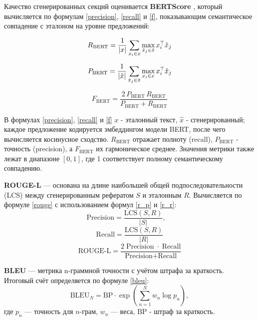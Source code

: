 \documentclass{article}
\theoremstyle{definition}
\theoremstyle{plain}
\begin{document}
Качество сгенерированных секций оценивается \textbf{BERTScore} \cite{bertscore}, который вычисляется по формулам \eqref{precision}, \eqref{recall} и \eqref{f}, показывающим семантическое совпадение с эталоном на уровне предложений:

\begin{equation}\label{precision}
R_{\mathrm{BERT}}= \frac{1}{|x|}\sum_{x_i\in x}\max_{\hat{x}_j\in\hat{x}} x_i^\top \hat{x}_j\\
\end{equation}

\begin{equation}\label{recall}
P_{\mathrm{BERT}}= \frac{1}{|\hat{x}|}\sum_{\hat{x}_j\in\hat{x}}\max_{x_i\in x} x_i^\top \hat{x}_j\\
\end{equation}

\begin{equation}\label{f}
F_{\mathrm{BERT}}= \frac{2\,P_{\mathrm{BERT}}\,R_{\mathrm{BERT}}}{P_{\mathrm{BERT}} + R_{\mathrm{BERT}}}
\end{equation}

В формулах  \eqref{precision}, \eqref{recall} и \eqref{f} \(x\) - эталонный текст, \(\hat{x}\) - сгенерированный; каждое предложение кодируется эмбеддингом модели BERT, после чего вычисляется косинусное сходство.  
\(R_{\mathrm{BERT}}\) отражает полноту (recall), \(P_{\mathrm{BERT}}\) - точность (precision), а \(F_{\mathrm{BERT}}\) их гармоническое среднее.  
Значения метрики также лежат в диапазоне \([0,1]\), где 1 соответствует полному семантическому совпадению.

\textbf{ROUGE-L} \cite{rouge} — основана на длине наибольшей общей подпоследовательности (LCS) между сгенерированным рефератом $S$ и эталонным $R$.
Вычисляется по формуле \eqref{rouge} с использованием формул \eqref{r_p} и \eqref{r_r}:
\begin{equation}\label{r_p}
  \text{Precision} = \frac{\mathrm{LCS}(S,R)}{|S|},\quad
\end{equation}
\begin{equation}\label{r_r}
  \text{Recall} = \frac{\mathrm{LCS}(S,R)}{|R|}
\end{equation}
\begin{equation}\label{rouge}
  \text{ROUGE‑L} = \frac{2\;\text{Precision}\;\cdot\;\text{Recall}}{\text{Precision} + \text{Recall}}
\end{equation}

\textbf{BLEU} \cite{bleu} — метрика n-граммной точности с учётом штрафа за краткость. Итоговый счёт определяется по формуле \eqref{bleu}:
\begin{equation}\label{bleu}
\mathrm{BLEU}_N = \mathrm{BP}\cdot \exp\!\left(\sum_{n=1}^{N} w_n \log p_n\right),
\end{equation}
где \(p_n\) — точность для \(n\)-грам, \(w_n\) — веса, $\mathrm{BP}$ - штраф за краткость.
\end{document}

